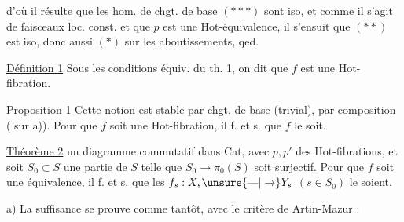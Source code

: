 
d'où il résulte que les hom. de chgt. de base
$(***)$ sont iso, et comme il s'agit de
faisceaux loc. const. et que $p$ est une
Hot-équivalence, il s'ensuit que $(**)$ est
iso, donc aussi $(*)$ sur les aboutissements,
qed.

\uline{Définition 1} Sous les conditions équiv. du th. 1,
on dit que $f$ est une Hot-fibration.

\uline{Proposition 1} Cette notion est stable par chgt. de
base (trivial), par composition ( sur a)). Pour
que $f$ soit une Hot-fibration, il f. et s. que $f$
le soit.


\uline{Théorème 2} 
un diagramme commutatif dans Cat, avec $p,p'$ des Hot-fibrations, et soit $S_0\subset S$ une partie de $S$ telle
que $S_0\to\pi_0(S)$ soit surjectif. Pour que $f$ soit
une équivalence, il f. et s. que les
$f_s:X_s\unsure{\text{---}|\to}Y_s$ $(s\in S_0)$ le soient.

a) La suffisance se prouve comme tantôt,
avec le critère de Artin-Mazur : 

